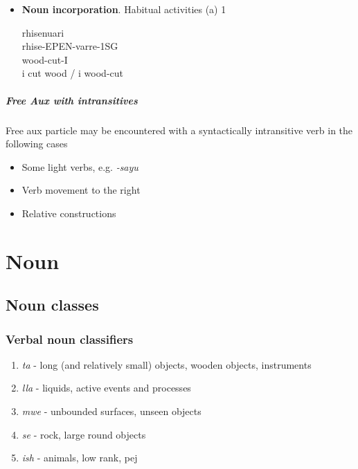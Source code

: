 \documentclass[8pt]{book}
\begin{document}
\begin{itemize}
\item \textbf{Noun incorporation}. Habitual activities (a)
1  
  \begin{xlista}
    \ex rhisenuari \\
        rhise-EPEN-varre-1SG \\
        wood-cut-I \\
        i cut wood / i wood-cut
  \end{xlista}

\end{itemize}

\paragraph{Free Aux with intransitives}
Free aux particle may be encountered with a syntactically intransitive verb in the following cases

\begin{itemize}
\item Some light verbs, e.g. \textit{-sayu} 
\item Verb movement to the right
\item Relative constructions
\end{itemize}


\chapter{Noun}

\section{Noun classes}
\subsection{Verbal noun classifiers}

\begin{enumerate}
\item \textit{ta} - long (and relatively small) objects, wooden objects, instruments
\item \textit{lla} - liquids, active events and processes
\item \textit{mwe} - unbounded surfaces, unseen objects
\item \textit{se} - rock,  large round objects
\item \textit{ish} - animals, low rank, pej
\end{enumerate}
\end{document}
